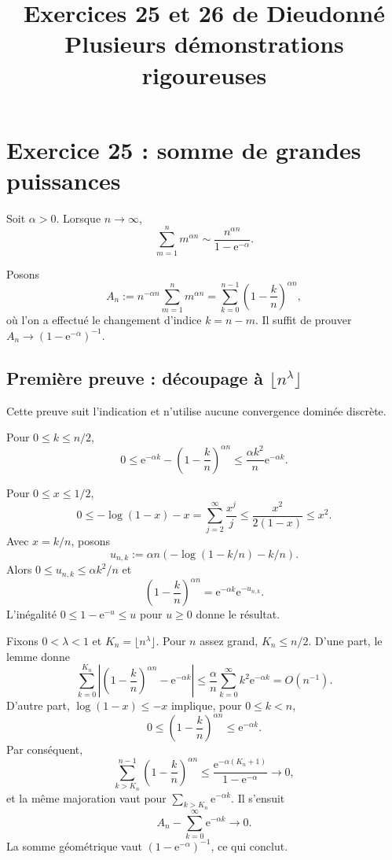 \documentclass[11pt,a4paper]{article}
\title{Exercices 25 et 26 de Dieudonné\\\large Plusieurs démonstrations rigoureuses}
\author{}
\date{}
\newcommand{\e}{\mathrm e}
\begin{document}
\maketitle
\tableofcontents

\section{Exercice 25 : somme de grandes puissances}

\begin{theorembox}
Soit $\alpha>0$. Lorsque $n\to\infty$,
\[
 \sum_{m=1}^{n}m^{\alpha n}\sim
 \frac{n^{\alpha n}}{1-\e^{-\alpha}}.
\]
\end{theorembox}

Posons
\[
 A_n:=n^{-\alpha n}\sum_{m=1}^{n}m^{\alpha n}
     =\sum_{k=0}^{n-1}\left(1-\frac{k}{n}\right)^{\alpha n},
\]
où l'on a effectué le changement d'indice $k=n-m$. Il suffit de prouver
$A_n\to(1-\e^{-\alpha})^{-1}$.

\subsection{Première preuve : découpage à $\lfloor n^\lambda\rfloor$}

Cette preuve suit l'indication et n'utilise aucune convergence dominée discrète.

\begin{lemmabox}[title=Approximation locale quantitative]
Pour $0\leq k\leq n/2$,
\[
0\leq \e^{-\alpha k}-\left(1-\frac{k}{n}\right)^{\alpha n}
\leq \frac{\alpha k^2}{n}\e^{-\alpha k}.
\]
\end{lemmabox}

\begin{proofbox}
Pour $0\leq x\leq 1/2$,
\[
0\leq-\log(1-x)-x=\sum_{j=2}^{\infty}\frac{x^j}{j}
\leq\frac{x^2}{2(1-x)}\leq x^2.
\]
Avec $x=k/n$, posons
\[
u_{n,k}:=\alpha n\left(-\log(1-k/n)-k/n\right).
\]
Alors $0\leq u_{n,k}\leq\alpha k^2/n$ et
\[
\left(1-\frac{k}{n}\right)^{\alpha n}=\e^{-\alpha k}\e^{-u_{n,k}}.
\]
L'inégalité $0\leq1-\e^{-u}\leq u$ pour $u\geq0$ donne le résultat.
\end{proofbox}

\begin{proofbox}[title=Preuve par découpage]
Fixons $0<\lambda<1$ et $K_n=\lfloor n^\lambda\rfloor$. Pour $n$ assez
grand, $K_n\leq n/2$. D'une part, le lemme donne
\[
\sum_{k=0}^{K_n}\left|\left(1-\frac{k}{n}\right)^{\alpha n}
-\e^{-\alpha k}\right|
\leq\frac{\alpha}{n}\sum_{k=0}^{\infty}k^2\e^{-\alpha k}=O(n^{-1}).
\]
D'autre part, $\log(1-x)\leq-x$ implique, pour $0\leq k<n$,
\[
0\leq\left(1-\frac{k}{n}\right)^{\alpha n}\leq\e^{-\alpha k}.
\]
Par conséquent,
\[
\sum_{k>K_n}^{n-1}\left(1-\frac{k}{n}\right)^{\alpha n}
\leq\frac{\e^{-\alpha(K_n+1)}}{1-\e^{-\alpha}}\to0,
\]
et la même majoration vaut pour $\sum_{k>K_n}\e^{-\alpha k}$. Il s'ensuit
\[
A_n-\sum_{k=0}^{\infty}\e^{-\alpha k}\to0.
\]
La somme géométrique vaut $(1-\e^{-\alpha})^{-1}$, ce qui conclut.
\end{proofbox}
\end{document}
